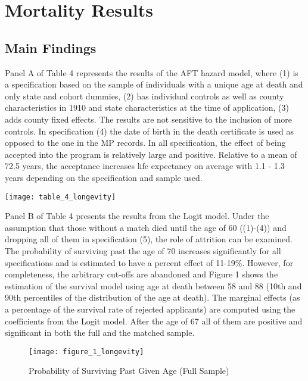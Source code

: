 \section{Mortality Results}\label{results}
\subsection{Main Findings}
Panel A of Table 4 represents the results of the AFT hazard model, where
(1) is a specification based on the sample of individuals with a unique
age at death and only state and cohort dummies, (2) has individual
controls as well as county characteristics in 1910 and state
characteristics at the time of application, (3) adds county fixed
effects. The results are not sensitive to the inclusion of more
controls. In specification (4) the date of birth in the death
certificate is used as opposed to the one in the MP records. In all
specification, the effect of being accepted into the program is
relatively large and positive. Relative to a mean of 72.5 years, the
acceptance increases life expectancy on average with 1.1 - 1.3 years
depending on the specification and sample used.
\begin{figure*}[h!]
\begin{center}
\texttt{[image: table\_4\_longevity]}
\end{center}
\end{figure*}

\noindent
Panel B of Table 4 presents the results from the Logit model. Under the
assumption that those without a match died until the age of 60 ((1)-(4))
and dropping all of them in specification (5), the role of attrition can
be examined. The probability of surviving past the age of 70 increases
significantly for all specifications and is estimated to have a percent
effect of 11-19\%. However, for completeness, the arbitrary cut-offs
are abandoned and Figure 1 shows the estimation of the survival model
using age at death between 58 and 88 (10th and 90th percentiles of the
distribution of the age at death). The marginal effects (as a percentage
of the survival rate of rejected applicants) are computed using the
coefficients from the Logit model. After the age of 67 all of them are
positive and significant in both the full and the matched sample.

\begin{figure}[h!]
\begin{center}
\texttt{[image: figure\_1\_longevity]}
\caption{{Probability of Surviving Past Given Age (Full Sample)
{\label{120529}}%
}}
\end{center}
\end{figure}

